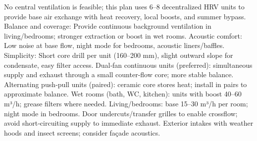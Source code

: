 \markdownRendererDocumentBegin
\markdownRendererSectionBegin
{}\markdownRendererInterblockSeparator
{}No central ventilation is feasible; this plan uses 6–8 decentralized HRV units to provide base air exchange with heat recovery, local boosts, and summer bypass.\markdownRendererInterblockSeparator
{}\markdownRendererSectionBegin
{}\markdownRendererInterblockSeparator
{}\markdownRendererUlBeginTight
\markdownRendererUlItem Balance and coverage: Provide continuous background ventilation in living/bedrooms; stronger extraction or boost in wet rooms.\markdownRendererUlItemEnd 
\markdownRendererUlItem Acoustic comfort: Low noise at base flow, night mode for bedrooms, acoustic liners/baffles.\markdownRendererUlItemEnd 
\markdownRendererUlItem Simplicity: Short core drill per unit (160–200 mm), slight outward slope for condensate, easy filter access.\markdownRendererUlItemEnd 
\markdownRendererUlEndTight \markdownRendererInterblockSeparator
{}
\markdownRendererSectionEnd \markdownRendererSectionBegin
{}\markdownRendererInterblockSeparator
{}\markdownRendererUlBeginTight
\markdownRendererUlItem Dual‑fan continuous units (preferred): simultaneous supply and exhaust through a small counter‑flow core; more stable balance.\markdownRendererUlItemEnd 
\markdownRendererUlItem Alternating push‑pull units (paired): ceramic core stores heat; install in pairs to approximate balance.\markdownRendererUlItemEnd 
\markdownRendererUlEndTight \markdownRendererInterblockSeparator
{}
\markdownRendererSectionEnd \markdownRendererSectionBegin
{}\markdownRendererInterblockSeparator
{}\markdownRendererUlBeginTight
\markdownRendererUlItem Wet rooms (bath, WC, kitchen): units with boost 40–60 m³/h; grease filters where needed.\markdownRendererUlItemEnd 
\markdownRendererUlItem Living/bedrooms: base 15–30 m³/h per room; night mode in bedrooms.\markdownRendererUlItemEnd 
\markdownRendererUlItem Door undercuts/transfer grilles to enable crossflow; avoid short‑circuiting supply to immediate exhaust.\markdownRendererUlItemEnd 
\markdownRendererUlItem Exterior intakes with weather hoods and insect screens; consider façade acoustics.\markdownRendererUlItemEnd 
\markdownRendererUlEndTight \markdownRendererInterblockSeparator
{}
\markdownRendererSectionEnd \markdownRendererSectionBegin
{}\markdownRendererInterblockSeparator
{}\markdownRendererUlBeginTight
